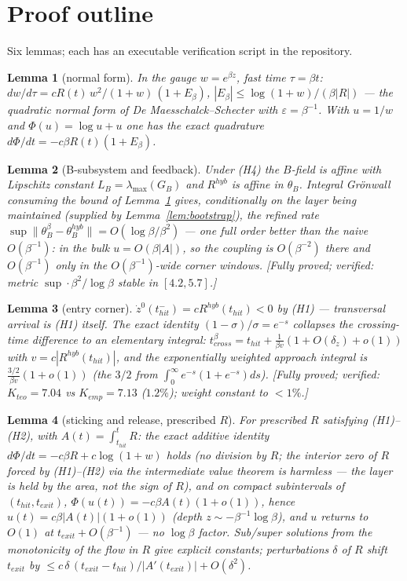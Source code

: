 \documentclass[11pt]{article}
\newtheorem{lemma}{Lemma}
\begin{document}
\section{Proof outline}\label{sec:proof}
Six lemmas; each has an executable verification script in the repository.

\begin{lemma}[normal form]\label{lem:gauge}
In the gauge $w=e^{\beta z}$, fast time $\tau=\beta t$:
$dw/d\tau=cR(t)\,w^2/(1+w)\,(1+E_\beta)$, $|E_\beta|\le\log(1+w)/(\beta|R|)$
--- the quadratic normal form of De Maesschalck--Schecter with
$\varepsilon=\beta^{-1}$. With $u=1/w$ and $\Phi(u)=\log u+u$ one has the exact
quadrature $d\Phi/dt=-c\beta R(t)(1+E_\beta)$.
\end{lemma}

\begin{lemma}[B-subsystem and feedback]\label{lem:gronwall}
Under (H4) the $B$-field is affine with Lipschitz constant
$L_B=\lambda_{\max}(G_B)$ and $R^{hyb}$ is affine in $\theta_B$. Integral
Gr\"onwall consuming the bound of Lemma~\ref{lem:gauge} gives, \emph{conditionally
on the layer being maintained} (supplied by Lemma~\ref{lem:bootstrap}), the refined rate
$\sup\|\theta_B^\beta-\theta_B^{hyb}\|= O(\log\beta/\beta^{2})$ --- one full
order better than the naive $O(\beta^{-1})$: in the bulk $u=O(\beta|A|)$, so the
coupling is $O(\beta^{-2})$ there and $O(\beta^{-1})$ only in the
$O(\beta^{-1})$-wide corner windows. [Fully proved; verified: metric
$\sup\cdot\beta^2/\log\beta$ stable in $[4.2,5.7]$.]
\end{lemma}

\begin{lemma}[entry corner]\label{lem:corner-in}
$\dot z^0(t_{hit}^-)=cR^{hyb}(t_{hit})<0$ by (H1) --- transversal arrival is
(H1) itself. The exact identity $(1-\sigma)/\sigma=e^{-s}$ collapses the
crossing-time difference to an elementary integral:
$t_{cross}^\beta=t_{hit}+\tfrac{1}{\beta v}(1+O(\delta_z)+o(1))$ with
$v=c|R^{hyb}(t_{hit})|$, and the exponentially weighted approach integral is
$\tfrac{3/2}{\beta v}(1+o(1))$ (the $3/2$ from $\int_0^\infty e^{-s}(1+e^{-s})ds$).
[Fully proved; verified: $K_{teo}=7.04$ vs $K_{emp}=7.13$ ($1.2\%$); weight
constant to $<1\%$.]
\end{lemma}

\begin{lemma}[sticking and release, prescribed $R$]\label{lem:release}
For prescribed $R$ satisfying (H1)--(H2), with $A(t)=\int_{t_{hit}}^t R$: the
exact additive identity $d\Phi/dt=-c\beta R+c\log(1+w)$ holds (no division by
$R$; the interior zero of $R$ forced by (H1)--(H2) via the intermediate value
theorem is harmless --- the layer is held by the \emph{area}, not the sign of
$R$), and on compact subintervals of $(t_{hit},t_{exit})$,
$\Phi(u(t))=-c\beta A(t)(1+o(1))$, hence $u(t)=c\beta|A(t)|(1+o(1))$ (depth $z\sim-\beta^{-1}\log\beta$), and $u$
returns to $O(1)$ at $t_{exit}+O(\beta^{-1})$ --- no $\log\beta$ factor. Sub/super
solutions from the monotonicity of the flow in $R$ give explicit constants;
perturbations $\delta$ of $R$ shift $t_{exit}$ by
$\le c\,\delta\,(t_{exit}-t_{hit})/|A'(t_{exit})|+O(\delta^2)$.
\end{lemma}
\end{document}
